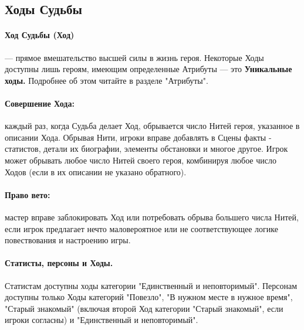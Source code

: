 \subsection{Ходы Судьбы}
\paragraph{Ход Судьбы (Ход)} — прямое вмешательство высшей силы в жизнь героя. Некоторые Ходы доступны лишь героям, имеющим определенные Атрибуты — это  \textbf{Уникальные ходы.} Подробнее об этом читайте в разделе "Атрибуты".
\paragraph{Совершение Хода:} каждый раз, когда Судьба делает Ход, обрывается число Нитей героя, указанное в описании Хода. Обрывая Нити, игроки вправе добавлять в Сцены факты - статистов, детали их биографии, элементы обстановки и многое другое. Игрок может обрывать любое число Нитей своего героя, комбинируя любое число Ходов (если в их описании не указано обратного).
\paragraph{Право вето:} мастер вправе заблокировать Ход или потребовать обрыва большего числа Нитей, если игрок предлагает нечто маловероятное или не соответствующее логике повествования и настроению игры.
\paragraph{Статисты, персоны и Ходы.} Статистам доступны ходы категории "Единственный и неповторимый". Персонам доступны только Ходы категорий "Повезло", "В нужном месте в нужное время", "Старый знакомый" (включая второй Ход категории "Старый знакомый", если игроки согласны) и "Единственный и неповторимый".

